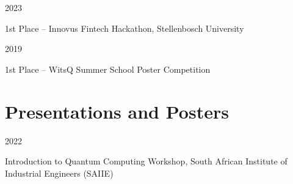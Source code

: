 \documentclass[9pt]{extreport}
\newcommand{\entry}[2]{%
  \noindent%
  \begin{minipage}[t]{2.25cm}%
    \raggedright #1%
  \end{minipage}%
  \hspace{0.4cm}%
  \begin{minipage}[t]{\dimexpr\textwidth-2cm\relax}%
    #2%
  \end{minipage}%
  \vspace{0.25cm}%
}
\begin{document}
\entry{2023}{1st Place -- Innovus Fintech Hackathon, Stellenbosch University}

\entry{2019}{1st Place -- WitsQ Summer School Poster Competition}









\section*{Presentations and Posters}

\entry{2022}{{Introduction to Quantum Computing Workshop}, South African Institute of Industrial Engineers (SAIIE)}
\end{document}
